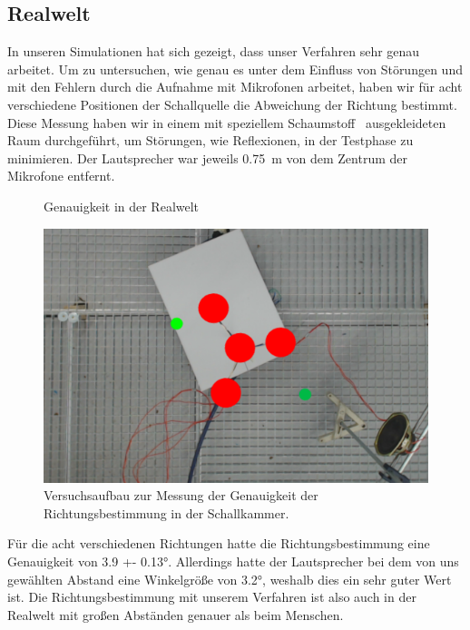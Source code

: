 \subsection{Realwelt}
In unseren Simulationen hat sich gezeigt, dass unser Verfahren sehr genau arbeitet. Um zu untersuchen, wie genau es unter dem Einfluss von Störungen und mit den Fehlern durch die Aufnahme mit Mikrofonen arbeitet, haben wir für acht verschiedene Positionen der Schallquelle die Abweichung der Richtung bestimmt. Diese Messung haben wir in einem mit speziellem Schaumstoff~\cite{BASOTECT} ausgekleideten Raum durchgeführt, um Störungen, wie Reflexionen, in der Testphase zu minimieren. Der Lautsprecher war jeweils \SI{0.75}{\meter} von dem Zentrum der Mikrofone entfernt.
\begin{figure}[H]
\begin{minipage}[b]{0.675\textwidth}
  \centering
  \resizebox{!}{0.675\textwidth}{}
  \caption{Genauigkeit in der Realwelt\label{fig:real}}
\end{minipage}
\hfill
\begin{minipage}[b]{0.3\textwidth}
  \centering
  \includegraphics[width=\textwidth]{img/pos_1}
  \caption{Versuchsaufbau zur Messung der Genauigkeit der Richtungsbestimmung in der Schallkammer.\label{fig:real_reral}}
\end{minipage}
\end{figure}
Für die acht verschiedenen Richtungen hatte die Richtungsbestimmung eine Genauigkeit von \ang[separate-uncertainty = true]{3.9 +- 0.13}. Allerdings hatte der Lautsprecher bei dem von uns gewählten Abstand eine Winkelgröße von \ang{3.2}, weshalb dies ein sehr guter Wert ist. Die Richtungsbestimmung mit unserem Verfahren ist also auch in der Realwelt mit großen Abständen genauer als beim Menschen.

